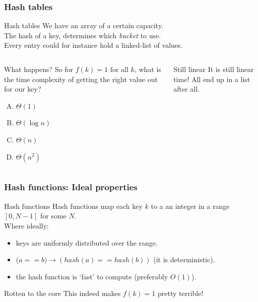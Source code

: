 \begin{frame}
	\frametitle{Hash tables}
	\begin{block}{Hash tables}
		We have an array of a certain capacity.\\
		The hash of a key, determines which \textit{bucket} to use.\\
		\pause
		Every entry could for instance hold a linked-list of values.
	\end{block}		
	\pause
	\begin{columns}
			
	\begin{questionblock}{What happens?}
		So for $f(k) = 1$ for all $k$, what is the time complexity of getting the right value out for our key?
		\begin{enumerate}[A.]
			\item $\Theta(1)$
			\item $\Theta(\log n)$
			\item $\Theta(n)$
			\item $\Theta(n^2)$
		\end{enumerate}
	\end{questionblock}
			
		\pause
		\begin{answerblock}{Still linear}
			It is still linear time! All end up in a list after all.
		\end{answerblock}
	\end{columns}
\end{frame}

\begin{frame}
	\frametitle{Hash functions: Ideal properties}
	
		\begin{block}{Hash functions}
			Hash functions map each key $k$ to a an integer in a range $[0, N-1]$ for some $N$.\\
			Where ideally:
			\pause
			\begin{itemize}
				\item keys are uniformly distributed over the range.
					\pause
				\item ($a == b) \to (\mathit{hash}(a) == \mathit{hash}(b))$ (it is deterministic).
					\pause
				\item the hash function is `fast' to compute (preferably $O(1)$).
			\end{itemize}

		\end{block}	
			\begin{alertblock}{Rotten to the core}
				This indeed makes $f(k) = 1$ pretty terrible!
			\end{alertblock}	
\end{frame}

